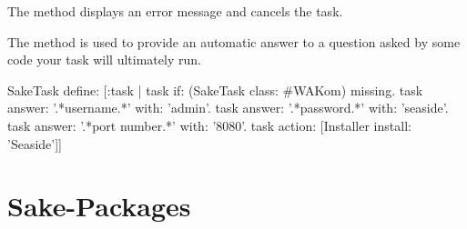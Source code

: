 \documentclass[a4paper,10pt,twoside]{book}
\begin{document}
The method  displays an error message and cancels the task.

The method  is used to provide an automatic answer to a question asked by some code your task will ultimately run.

\begin{code}{}
SakeTask define: [:task |
  task if: (SakeTask class: #WAKom) missing.
  task answer: '.*username.*' with: 'admin'.
  task answer: '.*password.*' with: 'seaside'.
  task answer: '.*port number.*' with: '8080'.
  task action: [Installer install: 'Seaside']]
\end{code}

\section{Sake-Packages}



\ifx\wholebook\relax\else
   
   
\end{document}
